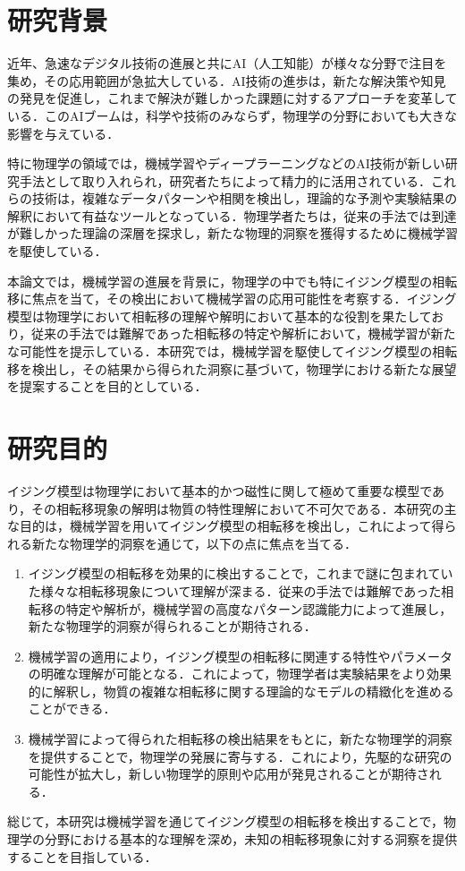\documentclass[a4paper,11pt]{jsreport}
\begin{document}
\section{研究背景}
近年、急速なデジタル技術の進展と共にAI（人工知能）が様々な分野で注目を集め，その応用範囲が急拡大している．AI技術の進歩は，新たな解決策や知見の発見を促進し，これまで解決が難しかった課題に対するアプローチを変革している．このAIブームは，科学や技術のみならず，物理学の分野においても大きな影響を与えている．\par
特に物理学の領域では，機械学習やディープラーニングなどのAI技術が新しい研究手法として取り入れられ，研究者たちによって精力的に活用されている．これらの技術は，複雑なデータパターンや相関を検出し，理論的な予測や実験結果の解釈において有益なツールとなっている．物理学者たちは，従来の手法では到達が難しかった理論の深層を探求し，新たな物理的洞察を獲得するために機械学習を駆使している．\par
本論文では，機械学習の進展を背景に，物理学の中でも特にイジング模型の相転移に焦点を当て，その検出において機械学習の応用可能性を考察する．イジング模型は物理学において相転移の理解や解明において基本的な役割を果たしており，従来の手法では難解であった相転移の特定や解析において，機械学習が新たな可能性を提示している．本研究では，機械学習を駆使してイジング模型の相転移を検出し，その結果から得られた洞察に基づいて，物理学における新たな展望を提案することを目的としている．
\section{研究目的}
イジング模型は物理学において基本的かつ磁性に関して極めて重要な模型であり，その相転移現象の解明は物質の特性理解において不可欠である．本研究の主な目的は，機械学習を用いてイジング模型の相転移を検出し，これによって得られる新たな物理学的洞察を通じて，以下の点に焦点を当てる．
\begin{enumerate}
  \item イジング模型の相転移を効果的に検出することで，これまで謎に包まれていた様々な相転移現象について理解が深まる．従来の手法では難解であった相転移の特定や解析が，機械学習の高度なパターン認識能力によって進展し，新たな物理学的洞察が得られることが期待される．
  \item 機械学習の適用により，イジング模型の相転移に関連する特性やパラメータの明確な理解が可能となる．これによって，物理学者は実験結果をより効果的に解釈し，物質の複雑な相転移に関する理論的なモデルの精緻化を進めることができる．
  \item 機械学習によって得られた相転移の検出結果をもとに，新たな物理学的洞察を提供することで，物理学の発展に寄与する．これにより，先駆的な研究の可能性が拡大し，新しい物理学的原則や応用が発見されることが期待される．
\end{enumerate}
総じて，本研究は機械学習を通じてイジング模型の相転移を検出することで，物理学の分野における基本的な理解を深め，未知の相転移現象に対する洞察を提供することを目指している．
\end{document}

